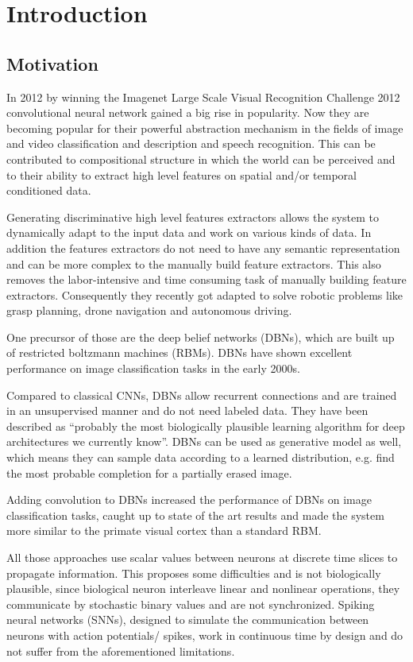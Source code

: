 \chapter{Introduction}

\section{Motivation}

In 2012 by winning the Imagenet Large Scale Visual Recognition Challenge 2012 convolutional neural network gained a big rise in popularity. 
Now they are becoming popular for their powerful abstraction mechanism in the fields of image and video classification and description and speech recognition. 
This can be contributed to compositional structure in which the world can be perceived and to their ability to extract high level features on spatial and/or temporal conditioned data.

Generating discriminative high level features extractors allows the system to dynamically adapt to the input data and work on various kinds of data. 
In addition the features extractors do not need to have any semantic representation and can be more complex to the manually build feature extractors. 
This also removes the labor-intensive and time consuming task of manually building feature extractors.
Consequently they recently got adapted to solve robotic problems like grasp planning, drone navigation and autonomous driving. 

One precursor of those are the deep belief networks (DBNs), which are built up of restricted boltzmann machines (RBMs). 
DBNs have shown excellent performance on image classification tasks in the early 2000s.

Compared to classical CNNs, DBNs allow recurrent connections and are trained in an unsupervised manner and do not need labeled data. 
They have been described as  “probably the most biologically plausible learning algorithm for deep architectures we currently know”. 
DBNs can be used as generative model as well, which means they can sample data according to a learned distribution, e.g. find the most probable completion for a partially erased image.

Adding convolution to DBNs increased the performance of DBNs on image classification tasks, caught up to state of the art results and made the system more similar to the primate visual cortex than a standard RBM. 

All those approaches use scalar values between neurons at discrete time slices to propagate information. 
This proposes some difficulties and is not biologically plausible, since biological neuron interleave linear and nonlinear operations, they communicate by stochastic binary values and are not synchronized. 
Spiking neural networks (SNNs), designed to simulate the communication between neurons with action potentials/ spikes, work in continuous time by design and do not suffer from the aforementioned limitations.


